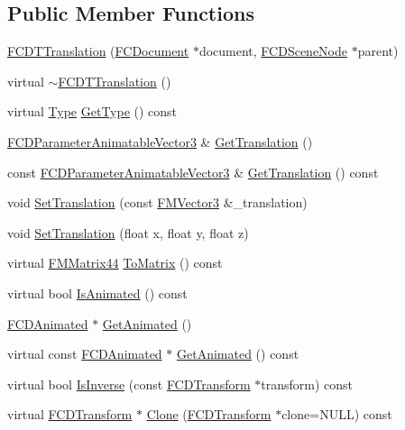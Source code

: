 \subsection*{Public Member Functions}
\begin{DoxyCompactItemize}
\item 
\hyperlink{classFCDTTranslation_a418dee555e3fbcc0866b141888ed4fb3}{FCDTTranslation} (\hyperlink{classFCDocument}{FCDocument} $\ast$document, \hyperlink{classFCDSceneNode}{FCDSceneNode} $\ast$parent)
\item 
virtual \hyperlink{classFCDTTranslation_aa7b2c790d0c2351d51be43d0d534e076}{$\sim$FCDTTranslation} ()
\item 
virtual \hyperlink{classFCDTransform_a13e561c5e53aeaf84dedf4661cdc8921}{Type} \hyperlink{classFCDTTranslation_ad72589137729bcf5ea8b88f0ad2b2208}{GetType} () const 
\item 
\hyperlink{classFCDParameterAnimatableT}{FCDParameterAnimatableVector3} \& \hyperlink{classFCDTTranslation_a5c1a55a6f71cac08b24efc9796f3da0a}{GetTranslation} ()
\item 
const \hyperlink{classFCDParameterAnimatableT}{FCDParameterAnimatableVector3} \& \hyperlink{classFCDTTranslation_ad2e5be4d26efd28a4b2b885d8a81d534}{GetTranslation} () const 
\item 
void \hyperlink{classFCDTTranslation_a5939f2f2de53b653e6d319999c707c89}{SetTranslation} (const \hyperlink{classFMVector3}{FMVector3} \&\_\-translation)
\item 
void \hyperlink{classFCDTTranslation_afbb217d569f2b3203f8af60333579b66}{SetTranslation} (float x, float y, float z)
\item 
virtual \hyperlink{classFMMatrix44}{FMMatrix44} \hyperlink{classFCDTTranslation_a70ad49113750b8f733e4b5682269c616}{ToMatrix} () const 
\item 
virtual bool \hyperlink{classFCDTTranslation_a6d74cff5dc8981b22e453054daeb2dbd}{IsAnimated} () const 
\item 
\hyperlink{classFCDAnimated}{FCDAnimated} $\ast$ \hyperlink{classFCDTTranslation_ad94a535671c213794b4246f3441879ed}{GetAnimated} ()
\item 
virtual const \hyperlink{classFCDAnimated}{FCDAnimated} $\ast$ \hyperlink{classFCDTTranslation_a11144dd99ef92c476e26be42ae71ab94}{GetAnimated} () const 
\item 
virtual bool \hyperlink{classFCDTTranslation_a860f284c757f5ceccf3f41a42c361aec}{IsInverse} (const \hyperlink{classFCDTransform}{FCDTransform} $\ast$transform) const 
\item 
virtual \hyperlink{classFCDTransform}{FCDTransform} $\ast$ \hyperlink{classFCDTTranslation_a3eb53e49377c85e7bde0c003751a7679}{Clone} (\hyperlink{classFCDTransform}{FCDTransform} $\ast$clone=NULL) const 
\end{DoxyCompactItemize}


